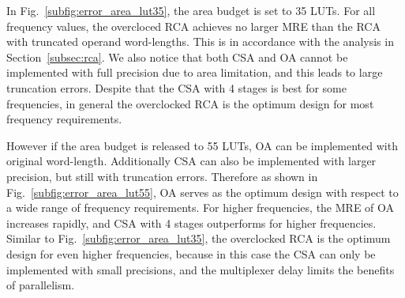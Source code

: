 \documentclass[10pt, conference, compsocconf]{IEEEtran}
\begin{document}
In Fig.~\ref{subfig:error_area_lut35}, the area budget is set to 35 LUTs. For all frequency values, the overcloced RCA achieves no larger MRE than the RCA with truncated operand word-lengths. This is in accordance with the analysis in Section~\ref{subsec:rca}. We also notice that both CSA and OA cannot be implemented with full precision due to area limitation, and this leads to large truncation errors. Despite that the CSA with 4 stages is best for some frequencies, in general the overclocked RCA is the optimum design for most frequency requirements.

However if the area budget is released to 55 LUTs, OA can be implemented with original word-length. Additionally CSA can also be implemented with larger precision, but still with truncation errors. Therefore as shown in Fig.~\ref{subfig:error_area_lut55}, OA serves as the optimum design with respect to a wide range of frequency requirements. For higher frequencies, the MRE of OA increases rapidly, and CSA with 4 stages outperforms for higher frequencies. Similar to Fig.~\ref{subfig:error_area_lut35}, the overclocked RCA is the optimum design for even higher frequencies, because in this case the CSA can only be implemented with small precisions, and the multiplexer delay limits the benefits of parallelism.
\end{document}
